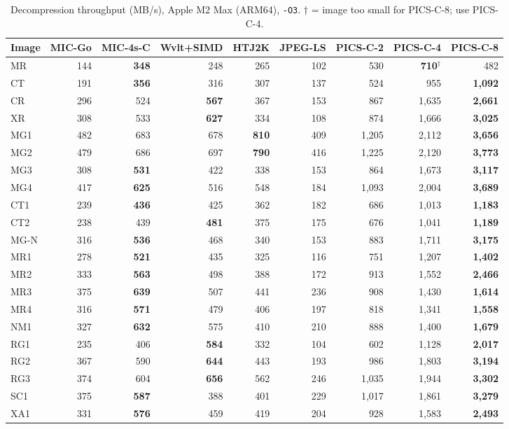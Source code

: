 \documentclass[10pt,twocolumn]{article}
\begin{document}
\begin{table}[t]
\centering
\footnotesize
\setlength{\tabcolsep}{4pt}
\caption{Decompression throughput (MB/s), Apple M2 Max (ARM64), \texttt{-O3}. $\dagger$ = image too small for PICS-C-8; use PICS-C-4.}
\label{tab:decomp-arm}
\begin{tabular}{lrrrrrrrr}
\toprule
Image & MIC-Go & MIC-4s-C & Wvlt+SIMD & HTJ2K & JPEG-LS & PICS-C-2 & PICS-C-4 & PICS-C-8 \\
\midrule
MR   & 144 & \textbf{348} & 248 & 265 & 102 & 530 & \textbf{710}$^\dagger$ & 482 \\
CT   & 191 & \textbf{356} & 316 & 307 & 137 & 524 & 955 & \textbf{1,092} \\
CR   & 296 & 524 & \textbf{567} & 367 & 153 & 867 & 1,635 & \textbf{2,661} \\
XR   & 308 & 533 & \textbf{627} & 334 & 108 & 874 & 1,666 & \textbf{3,025} \\
MG1  & 482 & 683 & 678 & \textbf{810} & 409 & 1,205 & 2,112 & \textbf{3,656} \\
MG2  & 479 & 686 & 697 & \textbf{790} & 416 & 1,225 & 2,120 & \textbf{3,773} \\
MG3  & 308 & \textbf{531} & 422 & 338 & 153 & 864 & 1,673 & \textbf{3,117} \\
MG4  & 417 & \textbf{625} & 516 & 548 & 184 & 1,093 & 2,004 & \textbf{3,689} \\
CT1  & 239 & \textbf{436} & 425 & 362 & 182 & 686 & 1,013 & \textbf{1,183} \\
CT2  & 238 & 439 & \textbf{481} & 375 & 175 & 676 & 1,041 & \textbf{1,189} \\
MG-N & 316 & \textbf{536} & 468 & 340 & 153 & 883 & 1,711 & \textbf{3,175} \\
MR1  & 278 & \textbf{521} & 435 & 325 & 116 & 751 & 1,207 & \textbf{1,402} \\
MR2  & 333 & \textbf{563} & 498 & 388 & 172 & 913 & 1,552 & \textbf{2,466} \\
MR3  & 375 & \textbf{639} & 507 & 441 & 236 & 908 & 1,430 & \textbf{1,614} \\
MR4  & 316 & \textbf{571} & 479 & 406 & 197 & 818 & 1,341 & \textbf{1,558} \\
NM1  & 327 & \textbf{632} & 575 & 410 & 210 & 888 & 1,400 & \textbf{1,679} \\
RG1  & 235 & 406 & \textbf{584} & 332 & 104 & 602 & 1,128 & \textbf{2,017} \\
RG2  & 367 & 590 & \textbf{644} & 443 & 193 & 986 & 1,803 & \textbf{3,194} \\
RG3  & 374 & 604 & \textbf{656} & 562 & 246 & 1,035 & 1,944 & \textbf{3,302} \\
SC1  & 375 & \textbf{587} & 388 & 401 & 229 & 1,017 & 1,861 & \textbf{3,279} \\
XA1  & 331 & \textbf{576} & 459 & 419 & 204 & 928 & 1,583 & \textbf{2,493} \\
\bottomrule
\end{tabular}
\end{table}
\end{document}
